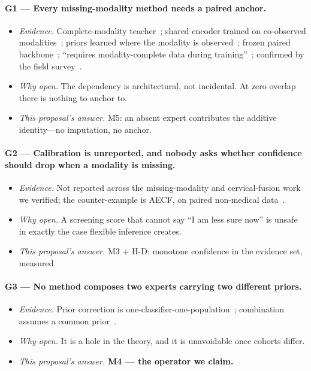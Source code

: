 \documentclass[sigplan,nonacm,screen]{acmart}
\begin{document}
\paragraph{G1 --- Every missing-modality method needs a paired anchor.}
\begin{itemize}
  \item \emph{Evidence.} Complete-modality teacher~\cite{wei2023mmanet}; shared encoder trained on co-observed modalities~\cite{wang2023shaspec}; priors learned where the modality is observed~\cite{ma2021smil}; frozen paired backbone~\cite{lee2023multimodal}; ``requires modality-complete data during training''~\cite{kim2024missing}; confirmed by the field survey~\cite{wu2024survey}.
  \item \emph{Why open.} The dependency is architectural, not incidental. At zero overlap there is nothing to anchor to.
  \item \emph{This proposal's answer.} M5: an absent expert contributes the additive identity---no imputation, no anchor.
\end{itemize}

\paragraph{G2 --- Calibration is unreported, and nobody asks whether confidence should drop when a modality is missing.}
\begin{itemize}
  \item \emph{Evidence.} Not reported across the missing-modality and cervical-fusion work we verified; the counter-example is AECF, on paired non-medical data~\cite{chlon2025aecf}.
  \item \emph{Why open.} A screening score that cannot say ``I am less sure now'' is unsafe in exactly the case flexible inference creates.
  \item \emph{This proposal's answer.} M3 + H-D: monotone confidence in the evidence set, measured.
\end{itemize}

\paragraph{G3 --- No method composes two experts carrying two different priors.}
\begin{itemize}
  \item \emph{Evidence.} Prior correction is one-classifier-one-population~\cite{saerens2002adjusting,godau2023deployment,alexandari2020maximum}; combination assumes a common prior~\cite{kittler1998combining,genest1986combining,chen2022proben}.
  \item \emph{Why open.} It is a hole in the theory, and it is unavoidable once cohorts differ.
  \item \emph{This proposal's answer.} \textbf{M4 --- the operator we claim.}
\end{itemize}
\end{document}
